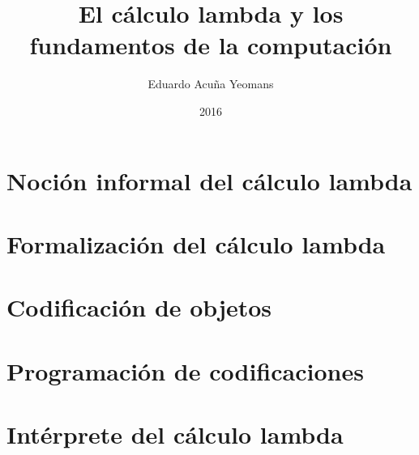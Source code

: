 \documentclass[letterpaper,twoside,openright,11pt]{book}
\theoremstyle{indented}
\begin{document}
\title{El cálculo lambda y los fundamentos de la computación}
\author{Eduardo Acuña Yeomans}
\date{2016}

\maketitle

\frontmatter
\tableofcontents

\mainmatter
\chapter{Noción informal del cálculo lambda}
\label{ch:nocion-informal}


\chapter{Formalización del cálculo lambda}
\label{ch:formalizacion}


\chapter{Codificación de objetos}
\label{ch:codificacion}


\appendix

\chapter{Programación de codificaciones}
\label{ap:lambda-scheme}


\chapter{Intérprete del cálculo lambda}
\label{ap:texlambda}


\nocite{*}


\end{document}
